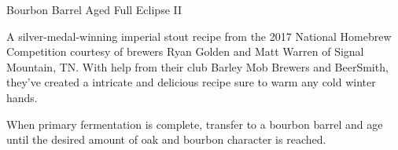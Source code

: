 \stylesection{\stylerussianimperialstout}

\begin{recipie}{Bourbon Barrel Aged Full Eclipse II}

\begin{aboutblock}
A silver-medal-winning imperial stout recipe from the 2017 National Homebrew
Competition courtesy of brewers Ryan Golden and Matt Warren of Signal Mountain, TN.
With help from their club Barley Mob Brewers and BeerSmith, they've created a
intricate and delicious recipe sure to warm any cold winter hands. 
\end{aboutblock}


\begin{methodandtiming}
 
\begin{mashsteps}
\end{mashsteps}

\begin{fermentationsteps}
\end{fermentationsteps}

\begin{directions}
When primary fermentation is complete, transfer to a bourbon barrel and age until
the desired amount of oak and bourbon character is reached.
\end{directions}

\end{methodandtiming}

\pagebreak

\begin{ingredientsblock}

\begin{malts}
\end{malts}

\begin{hops}

\end{hops}

\begin{yeasts}
\end{yeasts}

\end{ingredientsblock}

\end{recipie}